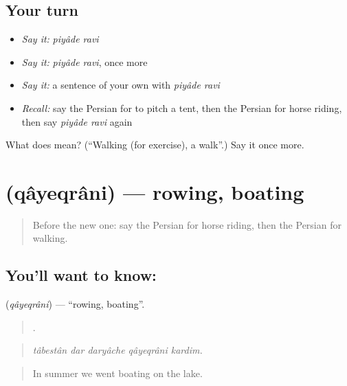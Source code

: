 \subsection*{Your turn}
\begin{itemize}
\raggedright
  \item \emph{Say it:} \emph{piyâde ravi}
  \item \emph{Say it:} \emph{piyâde ravi}, once more
  \item \emph{Say it:} a sentence of your own with \emph{piyâde ravi}
  \item \emph{Recall:} say the Persian for to pitch a tent, then the Persian for horse riding, then say \emph{piyâde ravi} again
\end{itemize}

\begin{tcolorbox}[breakable,colback=teal!4,colframe=teal!35!black,title={Before you move on}]
What does   mean? (\textquotedblleft{}Walking (for exercise), a walk\textquotedblright{}.) Say it once more.
\end{tcolorbox}
\section[\texorpdfstring{\fa{قایقرانی} (qâyeqrâni)}{قایقرانی (qâyeqrâni)}]{ (qâyeqrâni) — rowing, boating}

\label{lesson:FA-C511-qayeqrani}



\begin{quote}
Before the new one: say the Persian for horse riding, then the Persian for walking.
\end{quote}

\subsection*{You'll want to know: }
\textbf{} (\emph{qâyeqrâni}) — \textquotedblleft{}rowing, boating\textquotedblright{}.

\begin{quote}
    .
\end{quote}

\begin{quote}
\emph{tâbestân dar daryâche qâyeqrâni kardim.}
\end{quote}

\begin{quote}
In summer we went boating on the lake.
\end{quote}

